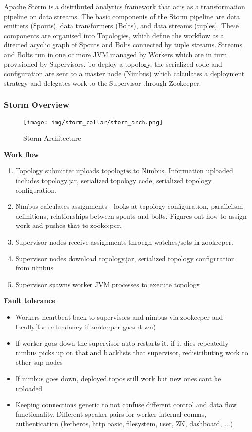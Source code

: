 

Apache Storm is a distributed analytics framework that acts as a transformation pipeline on data streams. The basic components of the Storm pipeline are data emitters (Spouts), data transformers (Bolts), and data streams (tuples). These components are organized into Topologies, which define the workflow as a directed acyclic graph of Spouts and Bolts connected by tuple streams. Streams and Bolts run in one or more JVM managed by Workers which are in turn provisioned by Supervisors. To deploy a topology, the serialized code and configuration are sent to a master node (Nimbus) which calculates a deployment strategy and delegates work to the Supervisor through Zookeeper.



\subsubsection{Storm Overview}

\begin{figure}[H]
\centering
\texttt{[image: img/storm\_cellar/storm\_arch.png]}
\caption{Storm Architecture}
\label{fig:storm_arch}
\end{figure} 

\textbf{Work flow}
\begin{enumerate}
\item Topology submitter uploads topologies to Nimbus. Information uploaded includes topology.jar, serialized topology code, serialized topology configuration. 
\item Nimbus calculates assignments - looks at topology configuration, parallelism definitions, relationships between spouts and bolts. Figures out how to assign work and pushes that to zookeeper.
\item Supervisor nodes receive assignments through watches/sets in zookeeper. 
\item Supervisor nodes download topology.jar, serialized topology configuration from nimbus
\item Supervisor spawns worker JVM processes to execute topology
\end{enumerate}



\textbf{Fault tolerance}
\begin{itemize}
\item Workers heartbeat back to supervisors and nimbus via zookeeper and locally(for redundancy if zookeeper goes down)
\item If worker goes down the supervisor auto restarts it. if it dies repeatedly nimbus picks up on that and blacklists that supervisor, redistributing work to other sup nodes
\item If nimbus goes down, deployed topos still work but new ones cant be uploaded
\item Keeping connections generic to not confuse different control and data flow functionality. Different speaker pairs for worker internal comms, authentication (kerberos, http basic, filesystem, user, ZK, dashboard, ...)
\end{itemize}





